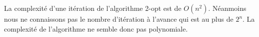 La complexité d'une itération de l'algorithme 2-opt est de $O(n^2)$. Néanmoins nous ne connaissons pas le nombre d'itération à l'avance qui est au plus de $2^n$. La complexité de l'algorithme ne semble donc pas polynomiale.